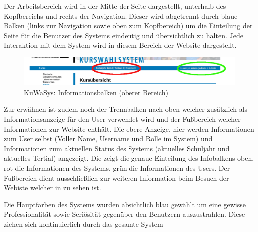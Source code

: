 Der Arbeitsbereich wird in der Mitte der Seite dargestellt, unterhalb des Kopfbereichs und rechts der Navigation. 
Dieser wird abgetrennt durch blaue Balken (links zur Navigation sowie oben zum Kopfbereich) um die Einteilung der Seite für die Benutzer des Systems eindeutig und übersichtlich zu halten.
Jede Interaktion mit dem System wird in diesem Bereich der Website dargestellt. 

\begin{figure}[h]
 \begin{center}
   \includegraphics[scale=0.4]{img/informationbar_KuWaSys.png}
 \end{center}
 \caption[\textbf{KuWaSys: Informationsbalken (oberer Bereich)}]{KuWaSys: Informationsbalken (oberer Bereich)}
 \label{fig:infobar_KuWaSys}
\end{figure}

Zur erwähnen ist zudem noch der Trennbalken nach oben welcher zusätzlich als Informationsanzeige für den User verwendet wird und der Fußbereich welcher Informationen zur Website enthält. 
Die obere Anzeige, hier werden Informationen zum User selbst (Voller Name, Username und Rolle im System) und Informationen zum aktuellen Status des Systems (aktuelles Schuljahr und aktuelles Tertial) angezeigt.
Die  zeigt die genaue Einteilung des Infobalkens oben, rot die Informationen des Systems, grün die Informationen des Users.
Der Fußbereich dient ausschließlich zur weiteren Information beim Besuch der Webiste welcher in  zu sehen ist.  

Die Hauptfarben des Systems wurden absichtlich blau gewählt um eine gewisse Professionalität sowie Seriösität gegenüber den Benutzern auszustrahlen. Diese ziehen sich kontinuierlich durch das gesamte System

